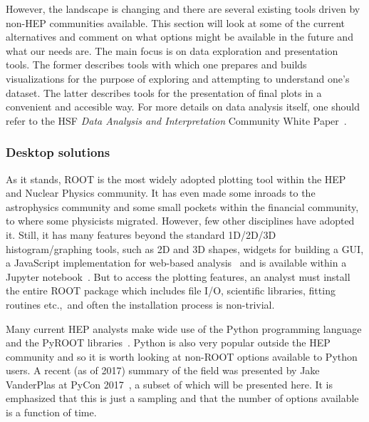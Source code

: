 \documentclass[12pt,a4paper]{article}
\begin{document}
However, the landscape is changing and there are several existing tools driven by non-HEP communities available. This section will look at
some of the current alternatives and comment on what options might be available in the future and what our needs are. The main focus is
on data exploration and presentation tools. The former describes tools with which one prepares and builds visualizations for the purpose
of exploring and attempting to understand one's dataset. The latter describes tools for the presentation of final plots in a convenient and accesible way.
For more details on data analysis itself, one should refer to the HSF \emph{Data Analysis and Interpretation} Community White Paper~\cite{HSF-CWP-2017-05}.

\hypertarget{stats-desktop}{%
\subsubsection{Desktop solutions}\label{stats-desktop}}

As it stands, ROOT is the most widely adopted plotting tool within the HEP and Nuclear Physics community.
It has even made some inroads to the astrophysics community and some small pockets within the financial community,
to where some physicists migrated. However, few other disciplines have adopted it. Still, it has many features beyond
the standard 1D/2D/3D histogram/graphing tools, such as 2D and 3D shapes, widgets for building a GUI, a JavaScript
implementation for web-based analysis~\cite{rootjs} and is available within a Jupyter notebook~\cite{JupyterNotebook}. But to
access the plotting features, an analyst must install the entire ROOT package which includes file I/O, scientific
libraries, fitting routines etc.,\ and often the installation process is non-trivial.

Many current HEP analysts make wide use of the Python programming language and the PyROOT libraries~\cite{PyROOT}.
Python is also very popular outside the HEP community and so it is worth looking at non-ROOT options available to Python users.
A recent (as of 2017) summary of the field was presented by Jake VanderPlas at PyCon 2017~\cite{VanderPlas2017}, a subset
of which will be presented here. It is emphasized that this is just a sampling and that the number of options available
is a function of time.
\end{document}
